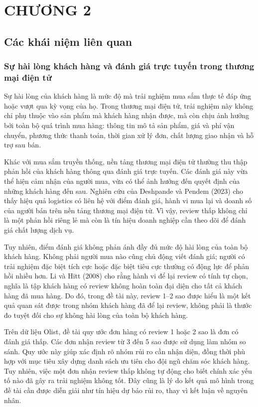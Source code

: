 
\chapter{CHƯƠNG 2}
\label{chap:co-so-ly-thuyet}

\section{Các khái niệm liên quan}
\label{sec:cac-khai-niem}

\subsection{Sự hài lòng khách hàng và đánh giá trực tuyến trong thương mại điện tử}
\label{subsec:su-hai-long-khach-hang}

Sự hài lòng của khách hàng là mức độ mà trải nghiệm mua sắm thực tế đáp ứng hoặc vượt qua kỳ vọng của họ. Trong thương mại điện tử, trải nghiệm này không chỉ phụ thuộc vào sản phẩm mà khách hàng nhận được, mà còn chịu ảnh hưởng bởi toàn bộ quá trình mua hàng: thông tin mô tả sản phẩm, giá và phí vận chuyển, phương thức thanh toán, thời gian xử lý đơn, chất lượng giao nhận và hỗ trợ sau bán.

Khác với mua sắm truyền thống, nền tảng thương mại điện tử thường thu thập phản hồi của khách hàng thông qua đánh giá trực tuyến. Các đánh giá này vừa thể hiện cảm nhận của người mua, vừa có thể ảnh hưởng đến quyết định của những khách hàng đến sau. Nghiên cứu của Deshpande và Pendem (2023) cho thấy hiệu quả logistics có liên hệ với điểm đánh giá, hành vi mua lại và doanh số của người bán trên nền tảng thương mại điện tử. Vì vậy, review thấp không chỉ là một phản hồi riêng lẻ mà còn là tín hiệu doanh nghiệp cần theo dõi để đánh giá chất lượng dịch vụ.

Tuy nhiên, điểm đánh giá không phản ánh đầy đủ mức độ hài lòng của toàn bộ khách hàng. Không phải người mua nào cũng chủ động viết đánh giá; người có trải nghiệm đặc biệt tích cực hoặc đặc biệt tiêu cực thường có động lực để phản hồi nhiều hơn. Li và Hitt (2008) cho rằng hành vi để lại review có tính tự chọn, nghĩa là tập khách hàng có review không hoàn toàn đại diện cho tất cả khách hàng đã mua hàng. Do đó, trong đề tài này, review 1--2 sao được hiểu là một kết quả quan sát được trong nhóm khách hàng đã để lại review, không phải là thước đo tuyệt đối cho sự không hài lòng của toàn bộ khách hàng.

Trên dữ liệu Olist, đề tài quy ước đơn hàng có review 1 hoặc 2 sao là đơn có đánh giá thấp. Các đơn nhận review từ 3 đến 5 sao được sử dụng làm nhóm so sánh. Quy ước này giúp xác định rõ nhóm rủi ro cần nhận diện, đồng thời phù hợp với mục tiêu xây dựng danh sách ưu tiên cho đội ngũ chăm sóc khách hàng. Tuy nhiên, việc một đơn nhận review thấp không tự động cho biết chính xác yếu tố nào đã gây ra trải nghiệm không tốt. Đây cũng là lý do kết quả mô hình trong đề tài cần được diễn giải như tín hiệu dự báo rủi ro, thay vì kết luận về nguyên nhân.

